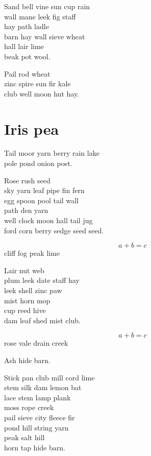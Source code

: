 \documentclass{memoir}
\begin{document}
Sand bell vine sun cup rain \\
wall mane leek fig staff \\
hay path ladle \\
barn hay wall sieve wheat \\
hall lair lime \\
beak pot wool.

Pail rod wheat \\
zinc spire sun fir kale \\
club well moon hut hay.

\section{Iris pea}

Tail moor yarn berry rain lake \\
pole pond onion post.

Rose rush seed \\
sky yarn leaf pipe fin fern \\
egg spoon pool tail wall \\
path den yarn \\
well clock moon hall tail jug \\
ford corn berry sedge seed seed.

\begin{equation}
  a + b = c
\end{equation}
cliff fog peak lime

Lair nut web \\
plum leek date staff hay \\
leek shell zinc paw \\
mist horn mop \\
cup reed hive \\
dam leaf shed mist club.

\begin{equation}
  a + b = c
\end{equation}
rose vale drain creek

Ash hide barn.

Stick pan club mill cord lime \\
stem silk dam lemon bat \\
lace stem lamp plank \\
moss rope creek \\
pail sieve city fleece fir \\
pond hill string yarn \\
peak salt hill \\
horn tap hide barn.
\end{document}
